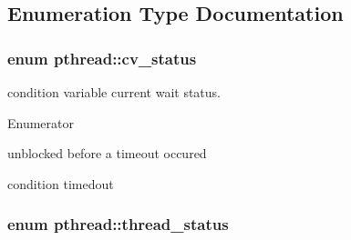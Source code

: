 \subsection{Enumeration Type Documentation}
\hypertarget{namespacepthread_a823f88a2bf448bd5bd5273b826830bdd}{
\subsubsection[{cv\+\_\+status}]{\setlength{\rightskip}{0pt plus 5cm}enum {\bf pthread\+::cv\+\_\+status}}}\label{namespacepthread_a823f88a2bf448bd5bd5273b826830bdd}
condition variable current wait status. \begin{Desc}
\item[Enumerator]\par
\begin{description}
\item[{\em 
\hypertarget{namespacepthread_a823f88a2bf448bd5bd5273b826830bdda633b1bc5140f77a22f2c26bea4fa3398}{no\+\_\+timeout}\label{namespacepthread_a823f88a2bf448bd5bd5273b826830bdda633b1bc5140f77a22f2c26bea4fa3398}
}]unblocked before a timeout occured \item[{\em 
\hypertarget{namespacepthread_a823f88a2bf448bd5bd5273b826830bdda1c2d3e88a4ad820053c817753867b31a}{timedout}\label{namespacepthread_a823f88a2bf448bd5bd5273b826830bdda1c2d3e88a4ad820053c817753867b31a}
}]condition timedout \end{description}
\end{Desc}
\hypertarget{namespacepthread_ac4b6e78f3d72c946ace7a92f3bec4101}{
\subsubsection[{thread\+\_\+status}]{\setlength{\rightskip}{0pt plus 5cm}enum {\bf pthread\+::thread\+\_\+status}\hspace{0.3cm}{\ttfamily [strong]}}}\label{namespacepthread_ac4b6e78f3d72c946ace7a92f3bec4101}
